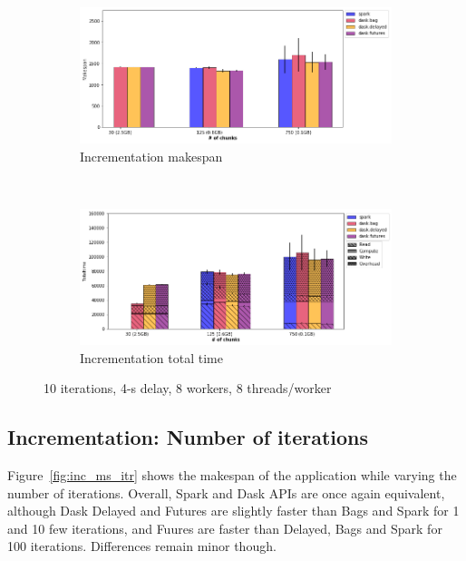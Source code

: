 \documentclass[conference]{IEEEtran}
\begin{document}
\begin{figure}[!t]
    \centering
    \begin{subfigure}[b]{\columnwidth}
        \includegraphics[clip,width=\columnwidth]{images/inc_block.png}%
        \caption{Incrementation makespan}\label{fig:inc_ms_block}
    \end{subfigure}
    \\
    \begin{subfigure}[b]{\columnwidth}
        \includegraphics[clip,width=\columnwidth]{images/inc_idle_block.png}%
        \caption{Incrementation total time}\label{fig:inc_tt_block}
    \end{subfigure}
    \caption{10 iterations, 4-s delay, 8 workers, 8 threads/worker}\label{fig:inc_block}
\end{figure}

\subsection{Incrementation: Number of iterations}
Figure~\ref{fig:inc_ms_itr} shows the makespan of the application while
varying the number of iterations. Overall,  Spark and Dask APIs are once
again equivalent, although Dask Delayed and Futures are slightly faster
than Bags and Spark for 1 and 10 few iterations, and Fuures are faster than
Delayed, Bags and Spark for 100 iterations. Differences remain minor
though.
\end{document}
